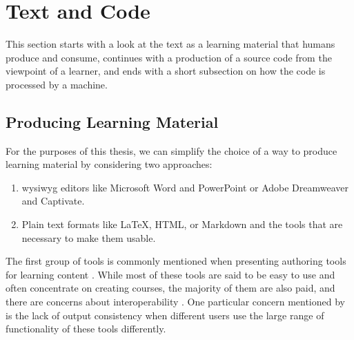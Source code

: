 \section{Text and Code}

This section starts with a look at the text as a learning material that humans produce and consume, continues with a production of a source code from the viewpoint of a learner, and ends with a short subsection on how the code is processed by a machine.

\subsection{Producing Learning Material}

For the purposes of this thesis, we can simplify the choice of a way to produce learning material by considering two approaches:

\begin{enumerate}
    \item \gls{wysiwyg} editors like Microsoft Word and PowerPoint or Adobe Dreamweaver and Captivate.
    \item Plain text formats like \LaTeX, HTML, or Markdown and the tools that are necessary to make them usable.
\end{enumerate}

The first group of tools is commonly mentioned when presenting authoring tools for learning content \parencite{khademi_review_nodate}.
While most of these tools are said to be easy to use and often concentrate on creating courses, the majority of them are also paid, and there are concerns about interoperability \parencites{khademi_review_nodate}{shieber_why_2014}.
One particular concern mentioned by \textcite{shieber_why_2014} is the lack of output consistency when different users use the large range of functionality of these tools differently.

